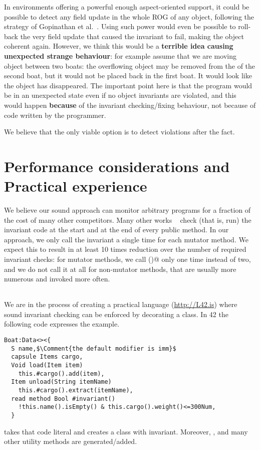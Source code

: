 In environments offering a powerful enough aspect-oriented support,
it could be possible to detect any field update in the whole ROG of
any object, following the strategy of 
Gopinathan et al.~\cite{Gopinathan:2008:RMO:1483018.1483028}.
Using such power would even be possible to roll-back the very field update that caused 
the invariant to fail, making the object coherent again.
However, we think this would be a \textbf{terrible idea causing unexpected strange behaviour}: for example
assume that we are moving object between two boats:
the overflowing object may be removed from the \Q@cargo@ of the second boat, but it would not
be placed back in the first boat. It would look like the object has disappeared.
The important point here is that the program would be in an unexpected state
even if no object invariants are violated, and this would happen \textbf{because} of the 
invariant checking/fixing behaviour, not because of code written by the programmer.

We believe that the only viable option is to detect violations after the fact.




\saveSpace
\section{Performance considerations and Practical experience}
\saveSpace
We believe our sound approach can monitor arbitrary programs
for a fraction of the cost of many other competitors.
Many other works%
~\cite{feldman2006jose,fahndrich2010embedded,abercrombie2002jcontractor,tran2003design}
 check (that is, run)
the invariant code at the start and at the end of every public
method.
In  our approach,
we only call the invariant a single time for each mutator method.
We expect this to result in at least 10 times reduction over
the number of required invariant checks:
for mutator methods, we call \Q@invariant()@ only one time instead of two,
and we
do not call it at all for non-mutator methods, that
 are usually more numerous and invoked more often.

${}_{}$

\noindent We are in the process of creating a practical language (\url{http://L42.is})
 where sound invariant checking can be enforced by decorating a class.
In 42 the following code expresses the \Q@Boat@ example.
\begin{lstlisting}
Boat:Data<><{
  S name,$\Comment{the default modifier is imm}$
  capsule Items cargo,
  Void load(Item item)
    this.#cargo().add(item),
  Item unload(String itemName)
    this.#cargo().extract(itemName),
  read method Bool #invariant()
    !this.name().isEmpty() & this.cargo().weight()<=300Num,
  }
\end{lstlisting}
\Q@Data@ takes that code literal and creates a \Q@Boat@ class with invariant.
Moreover, \Q@equals@, \Q@toString@ and many other utility methods are generated/added.

